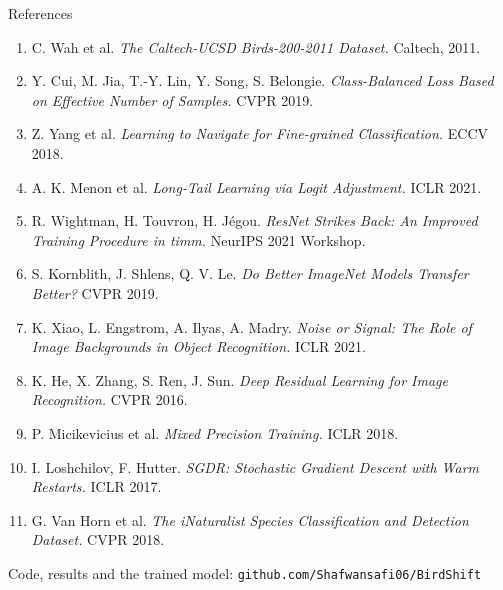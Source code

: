 \documentclass[aspectratio=169,10pt]{beamer}
\newcommand{\aside}[1]{{\footnotesize\color{muted}#1}}
\begin{document}
\begin{frame}{References}
\scriptsize
\begin{enumerate}\setlength{\itemsep}{2pt}
  \item[{[1]}] C. Wah et al. \textit{The Caltech-UCSD Birds-200-2011 Dataset.} Caltech, 2011.
  \item[{[2]}] Y. Cui, M. Jia, T.-Y. Lin, Y. Song, S. Belongie. \textit{Class-Balanced Loss Based on Effective Number of Samples.} CVPR 2019.
  \item[{[3]}] Z. Yang et al. \textit{Learning to Navigate for Fine-grained Classification.} ECCV 2018.
  \item[{[4]}] A. K. Menon et al. \textit{Long-Tail Learning via Logit Adjustment.} ICLR 2021.
  \item[{[5]}] R. Wightman, H. Touvron, H. J\'egou. \textit{ResNet Strikes Back: An Improved Training Procedure in timm.} NeurIPS 2021 Workshop.
  \item[{[6]}] S. Kornblith, J. Shlens, Q. V. Le. \textit{Do Better ImageNet Models Transfer Better?} CVPR 2019.
  \item[{[7]}] K. Xiao, L. Engstrom, A. Ilyas, A. Madry. \textit{Noise or Signal: The Role of Image Backgrounds in Object Recognition.} ICLR 2021.
  \item[{[8]}] K. He, X. Zhang, S. Ren, J. Sun. \textit{Deep Residual Learning for Image Recognition.} CVPR 2016.
  \item[{[9]}] P. Micikevicius et al. \textit{Mixed Precision Training.} ICLR 2018.
  \item[{[10]}] I. Loshchilov, F. Hutter. \textit{SGDR: Stochastic Gradient Descent with Warm Restarts.} ICLR 2017.
  \item[{[11]}] G. Van Horn et al. \textit{The iNaturalist Species Classification and Detection Dataset.} CVPR 2018.
\end{enumerate}
\vspace{0.3cm}
\aside{Code, results and the trained model: \texttt{github.com/Shafwansafi06/BirdShift}}
\end{frame}
\end{document}
